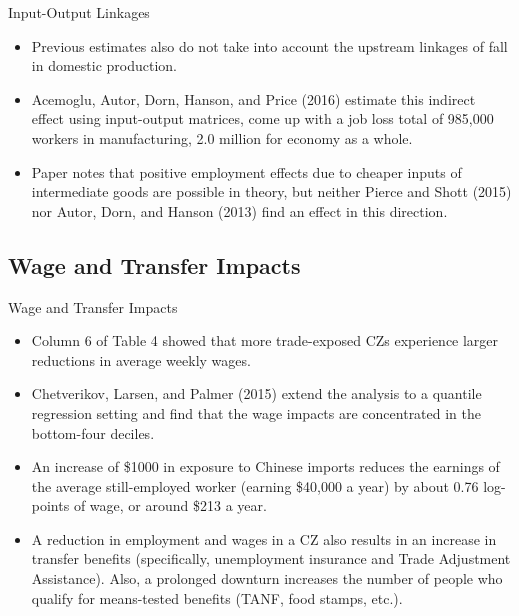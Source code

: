 \documentclass[aspectratio=169]{beamer}
\begin{document}

\begin{frame}{Input-Output Linkages}

\begin{itemize}
    \item<1-> Previous estimates also do not take into account the upstream linkages of fall in domestic production.
    \item<2-> Acemoglu, Autor, Dorn, Hanson, and Price (2016) estimate this indirect effect using input-output matrices, come up with a job loss total of 985,000 workers in manufacturing, 2.0 million for economy as a whole.
    \item<3-> Paper notes that positive employment effects due to cheaper inputs of intermediate goods are possible in theory, but neither Pierce and Shott (2015) nor Autor, Dorn, and Hanson (2013) find an effect in this direction.
\end{itemize}
    
\end{frame}


\subsection{Wage and Transfer Impacts}


\begin{frame}{Wage and Transfer Impacts}

\begin{itemize}
    \item<1-> Column 6 of Table 4 showed that more trade-exposed CZs experience larger reductions in average weekly wages.
    \item<2-> Chetverikov, Larsen, and Palmer (2015) extend the analysis to a quantile regression setting and find that the wage impacts are concentrated in the bottom-four deciles.
    \item<3-> An increase of \$1000 in exposure to Chinese imports reduces the earnings of the average still-employed worker (earning \$40,000 a year) by about 0.76 log-points of wage, or around \$213 a year.
    \item<4-> A reduction in employment and wages in a CZ also results in an increase in transfer benefits (specifically, unemployment insurance and Trade Adjustment Assistance).  Also, a prolonged downturn increases the number of people who qualify for means-tested benefits (TANF, food stamps, etc.).
\end{itemize}
    
\end{frame}
\end{document}
